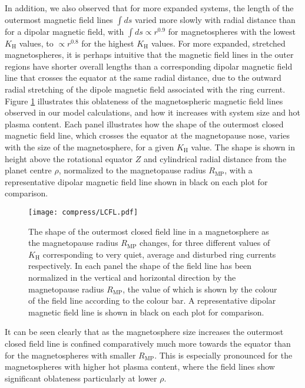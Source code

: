 In addition, we also observed that for more expanded systems, the length of the outermost magnetic field lines $\int ds$ varied more slowly with radial distance than for a dipolar magnetic field, with $\int ds \propto r^{0.9}$ for magnetospheres with the lowest $K_\mathrm{H}$ values, to $\propto r^{0.8}$ for the highest $K_\mathrm{H}$ values. For more expanded, stretched magnetospheres, it is perhaps intuitive that the magnetic field lines in the outer regions have shorter overall lengths than a corresponding dipolar magnetic field line that crosses the equator at the same radial distance, due to the outward radial stretching of the dipole magnetic field associated with the ring current. Figure \ref{compress:fig:LCFL} illustrates this oblateness of the magnetospheric magnetic field lines observed in our model calculations, and how it increases with system size and hot plasma content. Each panel illustrates how the shape of the outermost closed magnetic field line, which crosses the equator at the magnetopause nose, varies with the size of the magnetosphere, for a given $K_\mathrm{H}$ value. The shape is shown in height above the rotational equator $Z$ and cylindrical radial distance from the planet centre $\rho$, normalized to the magnetopause radius $R_\mathrm{MP}$, with a representative dipolar magnetic field line shown in black on each plot for comparison.
\begin{figure}
\centering
\noindent\texttt{[image: compress/LCFL.pdf]}
\caption[Outermost magnetic field line shapes for the range in system size, $K_\mathrm{H}$ parameter space.]{The shape of the outermost closed field line in a magnetosphere as the magnetopause radius $R_\mathrm{MP}$ changes, for three different values of $K_\mathrm{H}$ corresponding to very quiet, average and disturbed ring currents respectively. In each panel the shape of the field line has been normalized in the vertical and horizontal direction by the magnetopause radius $R_\mathrm{MP}$, the value of which is shown by the colour of the field line according to the colour bar. A representative dipolar magnetic field line is shown in black on each plot for comparison.}
\label{compress:fig:LCFL}
\end{figure}

It can be seen clearly that as the magnetosphere size increases the outermost closed field line is confined comparatively much more towards the equator than for the magnetospheres with smaller $R_\mathrm{MP}$. This is especially pronounced for the magnetospheres with higher hot plasma content, where the field lines show significant oblateness particularly at lower $\rho$. 

